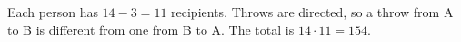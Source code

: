 Each person has $14-3=11$ recipients. Throws are directed, so a throw from A to B is different from one from B to A. The total is $14\cdot11=\boxed{154}$.
